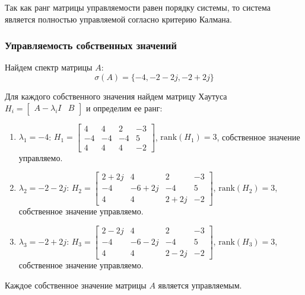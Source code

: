Так как ранг матрицы управляемости равен порядку системы, то система является полностью управляемой согласно критерию Калмана.

\subsubsection{Управляемость собственных значений}
Найдем спектр матрицы $A$:
\begin{equation}
    \sigma(A) = \{-4, -2-2j, -2+2j\}
\end{equation}

Для каждого собственного значения найдем матрицу Хаутуса $H_i = \begin{bmatrix} A - \lambda_i I & B \end{bmatrix}$ и определим ее ранг:
\begin{enumerate}
    \item $\lambda_1 = -4$: $H_1 = \begin{bmatrix}
        4 & 4 & 2 & -3\\
        -4 & -4 & -4 & 5 \\
        4 & 4 & 4 & -2
    \end{bmatrix}$, $\text{rank}(H_1) = 3$, собственное значение управляемо.
    \item $\lambda_2 = -2-2j$: $H_2 = \begin{bmatrix}
        2+2j & 4 & 2 & -3\\
        -4 & -6+2j & -4 & 5 \\
        4 & 4 & 2+2j & -2
    \end{bmatrix}$, $\text{rank}(H_2) = 3$, собственное значение управляемо.
    \item $\lambda_3 = -2+2j$: $H_3 = \begin{bmatrix}
        2-2j & 4 & 2 & -3\\
        -4 & -6-2j & -4 & 5 \\
        4 & 4 & 2-2j & -2
    \end{bmatrix}$, $\text{rank}(H_3) = 3$, собственное значение управляемо.
\end{enumerate}
Каждое собственное значение матрицы $A$ является управляемым. 


